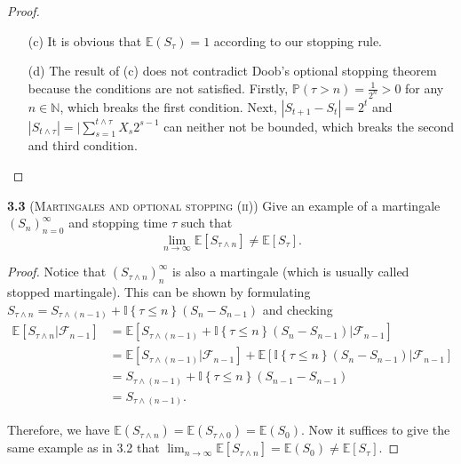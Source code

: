 \begin{proof}
\begin{enumerate}
        \item[(c)] It is obvious that $\mathbb{E}(S_\tau) = 1$ according to our stopping rule.
        \item[(d)] The result of (c) does not contradict Doob's optional stopping theorem because the conditions are not satisfied.
        Firstly, $\mathbb{P}(\tau > n) = \frac{1}{2^n} > 0$ for any $n \in \mathbb{N}$, which breaks the first condition.
        Next, $|S_{t+1} - S_{t}| = 2^t$ and $|S_{t \wedge \tau}| = |\sum_{s=1}^{t \wedge \tau} X_s 2^{s-1}$ can neither not be bounded, which breaks the second and third condition.
    \end{enumerate}
\end{proof}

\noindent\textbf{3.3}
(\textsc{Martingales and optional stopping (ii)}) Give an example of a martingale $\left(S_{n}\right)_{n=0}^{\infty}$ and
stopping time $\tau$ such that $$\lim _{n \rightarrow \infty} \mathbb{E}\left[S_{\tau \wedge n}\right] \neq \mathbb{E}\left[S_{\tau}\right].$$
\begin{proof}
    Notice that $(S_{\tau \wedge n})_n^\infty$ is also a martingale (which is usually called stopped martingale).
    This can be shown by formulating $S_{\tau \wedge n} = S_{\tau \wedge (n-1)} + \mathbb{I}\left\{\tau \leq n\right\} (S_n - S_{n-1})$ and checking
    \begin{equation*}
        \begin{aligned}
            \mathbb{E}[S_{\tau \wedge n} | \mathcal{F}_{n-1}]
            &= \mathbb{E}[S_{\tau \wedge (n-1)} + \mathbb{I}\left\{\tau \leq n\right\} (S_n - S_{n-1}) | \mathcal{F}_{n-1}]\\
            &= \mathbb{E}[S_{\tau \wedge (n-1)} | \mathcal{F}_{n-1}] + \mathbb{E}[\mathbb{I}\left\{\tau \leq n\right\} (S_n - S_{n-1}) | \mathcal{F}_{n-1}]\\
            &= S_{\tau \wedge (n-1)} + \mathbb{I}\left\{\tau \leq n\right\}(S_{n-1} - S_{n-1})\\
            &= S_{\tau \wedge (n-1)}.
        \end{aligned}
    \end{equation*}

    Therefore, we have $\mathbb{E}(S_{\tau \wedge n}) = \mathbb{E}(S_{\tau \wedge 0}) = \mathbb{E}(S_{0})$.
    Now it suffices to give the same example as in 3.2 that $\lim _{n \rightarrow \infty} \mathbb{E}\left[S_{\tau \wedge n}\right] = \mathbb{E}(S_{0}) \neq \mathbb{E}\left[S_{\tau}\right]$.
\end{proof}



